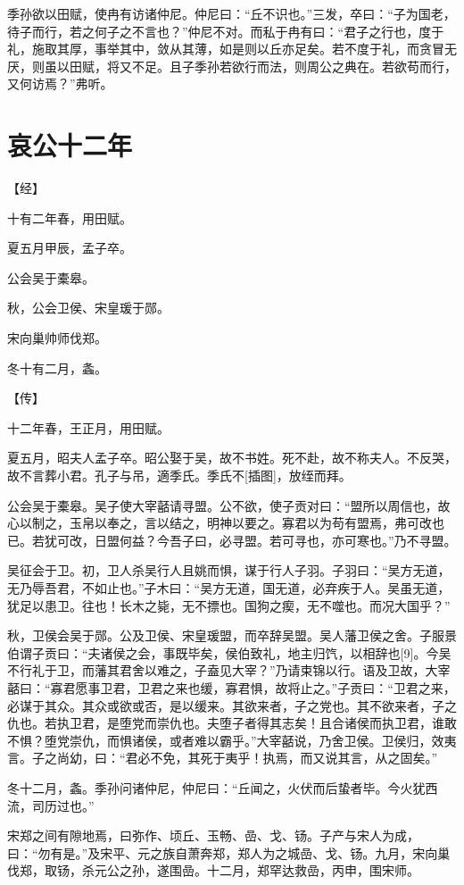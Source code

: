 \documentclass[a4paper,12pt,UTF8,twoside]{ctexbook}
\begin{document}
季孙欲以田赋，使冉有访诸仲尼。仲尼曰：“丘不识也。”三发，卒曰：“子为国老，待子而行，若之何子之不言也？”仲尼不对。而私于冉有曰：“君子之行也，度于礼，施取其厚，事举其中，敛从其薄，如是则以丘亦足矣。若不度于礼，而贪冒无厌，则虽以田赋，将又不足。且子季孙若欲行而法，则周公之典在。若欲苟而行，又何访焉？”弗听。


\chapter{哀公十二年}


【经】

十有二年春，用田赋。

夏五月甲辰，孟子卒。

公会吴于橐皋。

秋，公会卫侯、宋皇瑗于郧。

宋向巢帅师伐郑。

冬十有二月，螽。

【传】

十二年春，王正月，用田赋。

夏五月，昭夫人孟子卒。昭公娶于吴，故不书姓。死不赴，故不称夫人。不反哭，故不言葬小君。孔子与吊，適季氏。季氏不[插图]，放绖而拜。

公会吴于橐皋。吴子使大宰嚭请寻盟。公不欲，使子贡对曰：“盟所以周信也，故心以制之，玉帛以奉之，言以结之，明神以要之。寡君以为苟有盟焉，弗可改也已。若犹可改，日盟何益？今吾子曰，必寻盟。若可寻也，亦可寒也。”乃不寻盟。

吴征会于卫。初，卫人杀吴行人且姚而惧，谋于行人子羽。子羽曰：“吴方无道，无乃辱吾君，不如止也。”子木曰：“吴方无道，国无道，必弃疾于人。吴虽无道，犹足以患卫。往也！长木之毙，无不摽也。国狗之瘈，无不噬也。而况大国乎？”

秋，卫侯会吴于郧。公及卫侯、宋皇瑗盟，而卒辞吴盟。吴人藩卫侯之舍。子服景伯谓子贡曰：“夫诸侯之会，事既毕矣，侯伯致礼，地主归饩，以相辞也[9]。今吴不行礼于卫，而藩其君舍以难之，子盍见大宰？”乃请束锦以行。语及卫故，大宰嚭曰：“寡君愿事卫君，卫君之来也缓，寡君惧，故将止之。”子贡曰：“卫君之来，必谋于其众。其众或欲或否，是以缓来。其欲来者，子之党也。其不欲来者，子之仇也。若执卫君，是堕党而崇仇也。夫堕子者得其志矣！且合诸侯而执卫君，谁敢不惧？堕党崇仇，而惧诸侯，或者难以霸乎。”大宰嚭说，乃舍卫侯。卫侯归，效夷言。子之尚幼，曰：“君必不免，其死于夷乎！执焉，而又说其言，从之固矣。”

冬十二月，螽。季孙问诸仲尼，仲尼曰：“丘闻之，火伏而后蛰者毕。今火犹西流，司历过也。”

宋郑之间有隙地焉，曰弥作、顷丘、玉畅、嵒、戈、钖。子产与宋人为成，曰：“勿有是。”及宋平、元之族自萧奔郑，郑人为之城嵒、戈、钖。九月，宋向巢伐郑，取钖，杀元公之孙，遂围嵒。十二月，郑罕达救嵒，丙申，围宋师。
\end{document}
